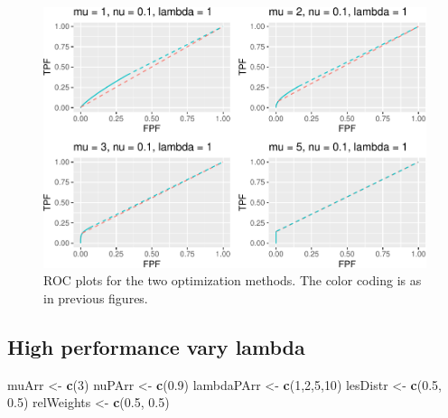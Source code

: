 \documentclass[
]{book}
\newenvironment{Shaded}{\begin{snugshade}}{\end{snugshade}}
\newcommand{\DecValTok}[1]{\textcolor[rgb]{0.00,0.00,0.81}{#1}}
\newcommand{\FloatTok}[1]{\textcolor[rgb]{0.00,0.00,0.81}{#1}}
\newcommand{\KeywordTok}[1]{\textcolor[rgb]{0.13,0.29,0.53}{\textbf{#1}}}
\newcommand{\NormalTok}[1]{#1}
\newcommand{\StringTok}[1]{\textcolor[rgb]{0.31,0.60,0.02}{#1}}
\begin{document}
\begin{figure}
\centering
\includegraphics{21-optim-op-point_files/figure-latex/optim-op-point-low-performance-vary-mu-vary-all-roc-1.pdf}
\caption{\label{fig:optim-op-point-low-performance-vary-mu-vary-all-roc}ROC plots for the two optimization methods. The color coding is as in previous figures.}
\end{figure}

\hypertarget{optim-op-point-high-performance-vary-lambda}{%
\subsection{High performance vary lambda}\label{optim-op-point-high-performance-vary-lambda}}

\begin{Shaded}
\begin{Highlighting}[]
\NormalTok{muArr <-}\StringTok{ }\KeywordTok{c}\NormalTok{(}\DecValTok{3}\NormalTok{)}
\NormalTok{nuPArr <-}\StringTok{ }\KeywordTok{c}\NormalTok{(}\FloatTok{0.9}\NormalTok{)}
\NormalTok{lambdaPArr <-}\StringTok{ }\KeywordTok{c}\NormalTok{(}\DecValTok{1}\NormalTok{,}\DecValTok{2}\NormalTok{,}\DecValTok{5}\NormalTok{,}\DecValTok{10}\NormalTok{)}
\NormalTok{lesDistr <-}\StringTok{ }\KeywordTok{c}\NormalTok{(}\FloatTok{0.5}\NormalTok{, }\FloatTok{0.5}\NormalTok{)}
\NormalTok{relWeights <-}\StringTok{ }\KeywordTok{c}\NormalTok{(}\FloatTok{0.5}\NormalTok{, }\FloatTok{0.5}\NormalTok{)}
\end{Highlighting}
\end{Shaded}
\end{document}
